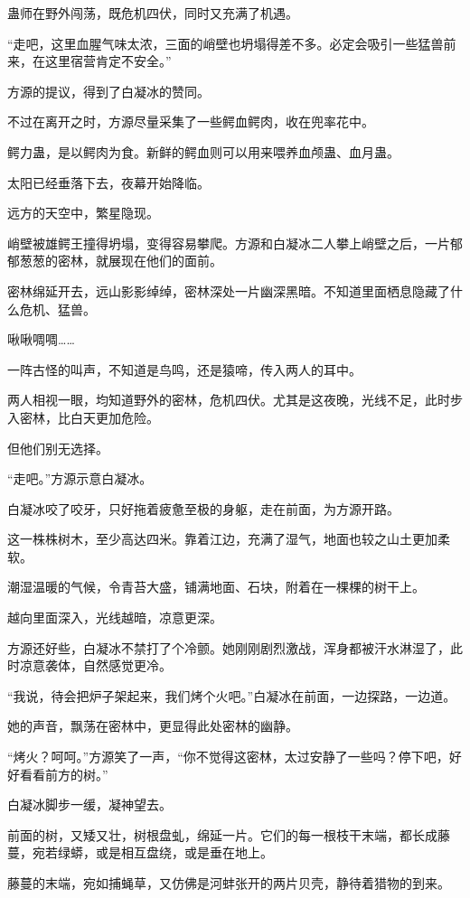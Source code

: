 \begin{this_body}
蛊师在野外闯荡，既危机四伏，同时又充满了机遇。

“走吧，这里血腥气味太浓，三面的峭壁也坍塌得差不多。必定会吸引一些猛兽前来，在这里宿营肯定不安全。”

方源的提议，得到了白凝冰的赞同。

不过在离开之时，方源尽量采集了一些鳄血鳄肉，收在兜率花中。

鳄力蛊，是以鳄肉为食。新鲜的鳄血则可以用来喂养血颅蛊、血月蛊。

太阳已经垂落下去，夜幕开始降临。

远方的天空中，繁星隐现。

峭壁被雄鳄王撞得坍塌，变得容易攀爬。方源和白凝冰二人攀上峭壁之后，一片郁郁葱葱的密林，就展现在他们的面前。

密林绵延开去，远山影影绰绰，密林深处一片幽深黑暗。不知道里面栖息隐藏了什么危机、猛兽。

啾啾啁啁……

一阵古怪的叫声，不知道是鸟鸣，还是猿啼，传入两人的耳中。

两人相视一眼，均知道野外的密林，危机四伏。尤其是这夜晚，光线不足，此时步入密林，比白天更加危险。

但他们别无选择。

“走吧。”方源示意白凝冰。

白凝冰咬了咬牙，只好拖着疲惫至极的身躯，走在前面，为方源开路。

这一株株树木，至少高达四米。靠着江边，充满了湿气，地面也较之山土更加柔软。

潮湿温暖的气候，令青苔大盛，铺满地面、石块，附着在一棵棵的树干上。

越向里面深入，光线越暗，凉意更深。

方源还好些，白凝冰不禁打了个冷颤。她刚刚剧烈激战，浑身都被汗水淋湿了，此时凉意袭体，自然感觉更冷。

“我说，待会把炉子架起来，我们烤个火吧。”白凝冰在前面，一边探路，一边道。

她的声音，飘荡在密林中，更显得此处密林的幽静。

“烤火？呵呵。”方源笑了一声，“你不觉得这密林，太过安静了一些吗？停下吧，好好看看前方的树。”

白凝冰脚步一缓，凝神望去。

前面的树，又矮又壮，树根盘虬，绵延一片。它们的每一根枝干末端，都长成藤蔓，宛若绿蟒，或是相互盘绕，或是垂在地上。

藤蔓的末端，宛如捕蝇草，又仿佛是河蚌张开的两片贝壳，静待着猎物的到来。


\end{this_body}
